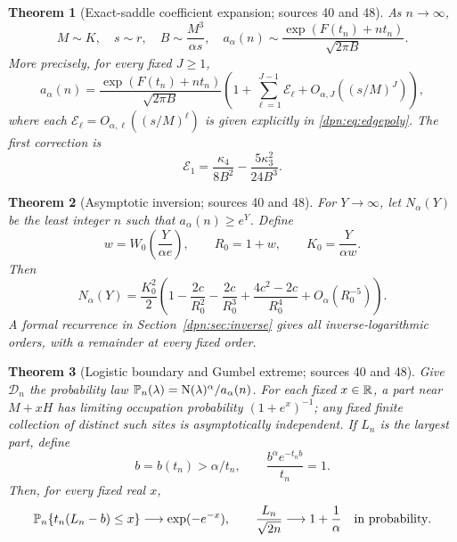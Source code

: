 \documentclass[11pt]{article}
\numberwithin{equation}{section}
\newtheorem{theorem}{Theorem}[section]
\theoremstyle{definition}\newtheorem{definition}[theorem]{Definition}
\theoremstyle{remark}\newtheorem{remark}[theorem]{Remark}
\newcommand{\normp}{\operatorname{N}}
\begin{document}
\begin{theorem}[Exact-saddle coefficient expansion; sources 40 and 48]\label{dpn:thm:saddle}
As $n\to\infty$,
\[
 M\sim K,\quad s\sim r,\quad B\sim\frac{M^3}{\alpha s},
 \quad
 a_\alpha(n)\sim\frac{\exp(F(t_n)+nt_n)}{\sqrt{2\pi B}}.
\]
More precisely, for every fixed $J\ge1$,
\begin{equation}\label{dpn:eq:edgeworth}
 a_\alpha(n)=\frac{\exp(F(t_n)+nt_n)}{\sqrt{2\pi B}}
 \left(1+\sum_{\ell=1}^{J-1}\mathcal E_\ell
       +O_{\alpha,J}((s/M)^J)\right),
\end{equation}
where each $\mathcal E_\ell=O_{\alpha,\ell}((s/M)^\ell)$ is given explicitly
in \eqref{dpn:eq:edgepoly}. The first correction is
\begin{equation}\label{dpn:eq:E1}
 \mathcal E_1=\frac{\kappa_4}{8B^2}
                    -\frac{5\kappa_3^2}{24B^3}.
\end{equation}
\end{theorem}

\begin{theorem}[Asymptotic inversion; sources 40 and 48]\label{dpn:thm:inverse}
For $Y\to\infty$, let $N_\alpha(Y)$ be the least integer $n$ such that
$a_\alpha(n)\ge e^Y$. Define
\begin{equation}\label{dpn:eq:Wlead}
 w=W_0\left(\frac{Y}{\alpha e}\right),\qquad R_0=1+w,
 \qquad K_0=\frac{Y}{\alpha w}.
\end{equation}
Then
\begin{equation}\label{dpn:eq:inverselead}
 N_\alpha(Y)=\frac{K_0^2}{2}\left(
 1-\frac{2c}{R_0^2}-\frac{2c}{R_0^3}
 +\frac{4c^2-2c}{R_0^4}+O_\alpha(R_0^{-5})\right).
\end{equation}
A formal recurrence in Section~\ref{dpn:sec:inverse} gives all inverse-logarithmic
orders, with a remainder at every fixed order.
\end{theorem}

\begin{theorem}[Logistic boundary and Gumbel extreme; sources 40 and 48]\label{dpn:thm:geometry}
Give $\mathcal D_n$ the probability law
$\Prob_n(\lambda)=\normp(\lambda)^\alpha/a_\alpha(n)$.
For each fixed $x\in\mathbb R$, a part near $M+xH$ has limiting occupation probability
$(1+e^x)^{-1}$; any fixed finite collection of distinct such sites is
asymptotically independent. If $L_n$ is the largest part, define
\begin{equation}\label{dpn:eq:bdef}
 b=b(t_n)>\alpha/t_n,\qquad
 \frac{b^\alpha e^{-t_nb}}{t_n}=1.
\end{equation}
Then, for every fixed real $x$,
\begin{equation}\label{dpn:eq:gumbel}
 \mathbb P_n\{t_n(L_n-b)\le x\}\longrightarrow \exp(-e^{-x}),
 \qquad \frac{L_n}{\sqrt{2n}}\longrightarrow 1+\frac1\alpha
 \quad\text{in probability}.
\end{equation}
\end{theorem}
\end{document}
